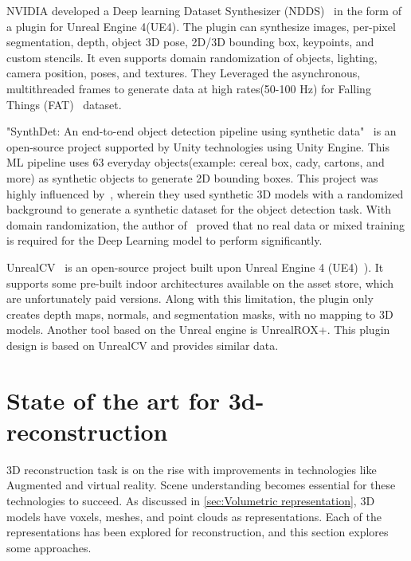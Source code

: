 NVIDIA developed a Deep learning Dataset Synthesizer (NDDS)~\cite{to2018ndds} in the form of a plugin for Unreal Engine 4(UE4).
The plugin can synthesize images, per-pixel segmentation, depth, object 3D pose, 2D/3D bounding box, keypoints, and custom stencils.
It even supports domain randomization of objects, lighting, camera position, poses, and textures.
They Leveraged the asynchronous, multithreaded frames to generate data at high rates(50-100 Hz) for Falling Things (FAT)~\cite{tremblay2018falling} dataset.

"SynthDet: An end-to-end object detection pipeline using synthetic data"~\cite{synthdet2020} is an open-source project supported by Unity technologies using Unity Engine.
This ML pipeline uses 63 everyday objects(example: cereal box, cady, cartons, and more) as synthetic objects to generate 2D bounding boxes.
This project was highly influenced by~\cite{hinterstoisser2019annotation}, wherein they used synthetic 3D models with a randomized background to generate a synthetic dataset for the object detection task.
With domain randomization, the author of~\cite{hinterstoisser2019annotation} proved that no real data or mixed training is required for the Deep Learning model to perform significantly.

UnrealCV~\cite{qiu2017unrealcv} is an open-source project built upon Unreal Engine 4 (UE4)~\cite{unrealengine}).
It supports some pre-built indoor architectures available on the asset store, which are unfortunately paid versions.
Along with this limitation, the plugin only creates depth maps, normals, and segmentation masks, with no mapping to 3D models.
Another tool based on the Unreal engine is UnrealROX+\cite{martinezgonzalez2021unrealrox}.
This plugin design is based on UnrealCV and provides similar data.

\section{State of the art for 3d-reconstruction}\label{sec:state_of_the_art}

3D reconstruction task is on the rise with improvements in technologies like Augmented and virtual reality.
Scene understanding becomes essential for these technologies to succeed.
As discussed in \autoref{sec:Volumetric representation}, 3D models have voxels, meshes, and point clouds as representations.
Each of the representations has been explored for reconstruction, and this section explores some approaches.

